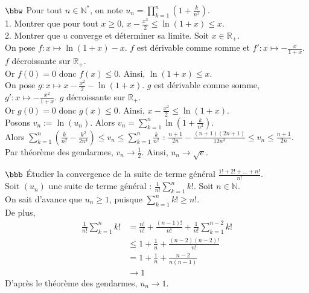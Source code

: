 \documentclass[11pt]{article}
\begin{document}
\begin{exercice}{$\bbw$}{}
    Pour tout $n\in\mathbb{N}^*$, on note $u_n=\prod\limits_{k=1}^{n}\left( 1 + \frac{k}{n^2} \right)$.\\
    1. Montrer que pour tout $x\geq0$, $x-\frac{x^2}{2} \leq \ln(1+x) \leq x$.\\
    2. Montrer que $u$ converge et déterminer sa limite.
    \tcblower
    Soit $x\in\mathbb{R}_+$.\\
     On pose $f:x\mapsto\ln(1+x) - x$. $f$ est dérivable comme somme et $f':x\mapsto-\frac{x}{1+x}$. $f$ décroissante sur $\mathbb{R}_+$.\\
    Or $f(0)=0$ donc $f(x)\leq0$. Ainsi, $\ln(1+x) \leq x$.\\[0.1cm]
    On pose $g:x\mapsto x-\frac{x^2}{2} - \ln(1+x)$. $g$ est dérivable comme somme, $g':x\mapsto -\frac{x^2}{1+x}$. $g$ décroissante sur $\mathbb{R}_+$.\\
    Or $g(0)=0$ donc $g(x)\leq0$. Ainsi, $x - \frac{x^2}{2} \leq \ln(1+x)$.\\[0.1cm]
     Posons $v_n := \ln(u_n)$. Alors $v_n = \sum\limits_{k=1}^n\ln\left( 1+\frac{k}{n^2} \right)$.\\
    Alors $\sum\limits_{k=1}^n(\frac{k}{n^2}-\frac{k^2}{2n^4}) \leq v_n \leq \sum\limits_{k=1}^n\frac{k}{n^2}$ : $\frac{n+1}{2n} - \frac{(n+1)(2n+1)}{12n^3}\leq v_n \leq \frac{n+1}{2n}$.\\
    Par théorème des gendarmes, $v_n \to \frac{1}{2}$. Ainsi, $u_n \to \sqrt{e}$.
\end{exercice}

\begin{exercice}{$\bbb$}{}
    Étudier la convergence de la suite de terme général $\frac{1! + 2! + ... + n!}{n!}$.\\
    Soit $(u_n)$ une suite de terme général : $\frac{1}{n!}\sum_{k=1}^nk!$.
    \tcblower
    Soit $n\in\mathbb{N}$.\\
    On sait d'avance que $u_n \geq 1$, puisque $\sum_{k=1}^nk! \geq n!$.\\
    De plus,
    \begin{align*}
        \frac{1}{n!}\sum_{k=1}^nk! &= \frac{n!}{n!} + \frac{(n-1)!}{n!} + \frac{1}{n!}\sum_{k=1}^{n-2}k!\\
        &\leq 1 + \frac{1}{n} + \frac{(n-2)(n-2)!}{n!}\\
        &= 1 + \frac{1}{n} + \frac{n-2}{n(n-1)}\\
        &\longrightarrow 1 
    \end{align*}
    D'après le théorème des gendarmes, $u_n \to 1$.
\end{exercice}
\end{document}
